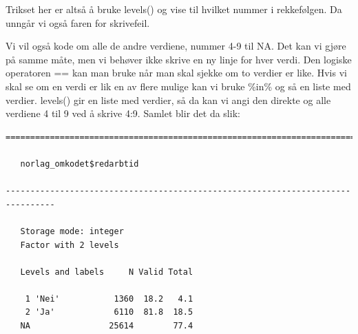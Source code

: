 \documentclass[
  letterpaper,
  DIV=11,
  numbers=noendperiod]{scrreprt}
\newenvironment{Shaded}{\begin{snugshade}}{\end{snugshade}}
\newcommand{\AttributeTok}[1]{\textcolor[rgb]{0.40,0.45,0.13}{#1}}
\newcommand{\ConstantTok}[1]{\textcolor[rgb]{0.56,0.35,0.01}{#1}}
\newcommand{\DecValTok}[1]{\textcolor[rgb]{0.68,0.00,0.00}{#1}}
\newcommand{\FunctionTok}[1]{\textcolor[rgb]{0.28,0.35,0.67}{#1}}
\newcommand{\NormalTok}[1]{\textcolor[rgb]{0.00,0.23,0.31}{#1}}
\newcommand{\OtherTok}[1]{\textcolor[rgb]{0.00,0.23,0.31}{#1}}
\newcommand{\SpecialCharTok}[1]{\textcolor[rgb]{0.37,0.37,0.37}{#1}}
\newcommand{\StringTok}[1]{\textcolor[rgb]{0.13,0.47,0.30}{#1}}
\begin{document}
Trikset her er altså å bruke levels() og vise til hvilket nummer i
rekkefølgen. Da unngår vi også faren for skrivefeil.

Vi vil også kode om alle de andre verdiene, nummer 4-9 til NA. Det kan
vi gjøre på samme måte, men vi behøver ikke skrive en ny linje for hver
verdi. Den logiske operatoren == kan man bruke når man skal sjekke om to
verdier er like. Hvis vi skal se om en verdi er lik en av flere mulige
kan vi bruke \%in\% og så en liste med verdier. levels() gir en liste
med verdier, så da kan vi angi den direkte og alle verdiene 4 til 9 ved
å skrive 4:9. Samlet blir det da slik:

\begin{Shaded}
\end{Shaded}

\begin{verbatim}
================================================================================

   norlag_omkodet$redarbtid

--------------------------------------------------------------------------------

   Storage mode: integer
   Factor with 2 levels

   Levels and labels     N Valid Total
                                      
    1 'Nei'           1360  18.2   4.1
    2 'Ja'            6110  81.8  18.5
   NA                25614        77.4
\end{verbatim}

\appendix
{}
\end{document}
